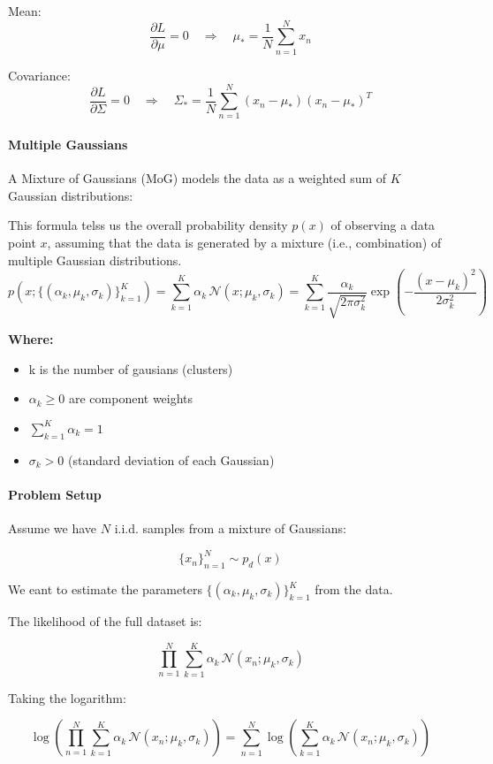 \documentclass[11pt]{article}
\begin{document}
Mean:
\[
	\frac{\partial L}{\partial \mu} = 0 \quad \Rightarrow \quad
	\mu_* = \frac{1}{N} \sum_{n=1}^{N} x_n
\]

Covariance:
\[
	\frac{\partial L}{\partial \Sigma} = 0 \quad \Rightarrow \quad
	\Sigma_* = \frac{1}{N} \sum_{n=1}^{N} (x_n - \mu_*)(x_n - \mu_*)^T
\]

\pagebreak

\paragraph*{Multiple Gaussians}

A Mixture of Gaussians (MoG) models the data as a weighted sum of $K$ Gaussian distributions:

\medskip
This formula telss us the overall probability density $p(x)$ of observing a data point $x$, assuming that the data is generated by a mixture (i.e., combination) of multiple Gaussian distributions.
\[
	p(x; \{(\alpha_k, \mu_k, \sigma_k)\}_{k=1}^K)
	= \sum_{k=1}^{K} \alpha_k \, \mathcal{N}(x; \mu_k, \sigma_k)
	= \sum_{k=1}^{K} \frac{\alpha_k}{\sqrt{2\pi\sigma_k^2}}
	\exp\left( -\frac{(x - \mu_k)^2}{2\sigma_k^2} \right)
\]

\textbf{Where:}
\begin{itemize}
	\item k is the number of gausians (clusters)
	\item $\alpha_k \geq 0$ are component weights
	\item $\sum_{k=1}^K \alpha_k = 1$
	\item $\sigma_k > 0$ (standard deviation of each Gaussian)
\end{itemize}

\paragraph*{Problem Setup}
Assume we have $N$ i.i.d. samples from a mixture of Gaussians:

\[
	\{x_n\}_{n=1}^N \sim p_d(x)
\]

We eant to estimate the parameters $\{(\alpha_k, \mu_k, \sigma_k)\}_{k=1}^K$ from the data.

\medskip

The likelihood of the full dataset is:

\[
	\prod_{n=1}^{N} \sum_{k=1}^{K} \alpha_k \, \mathcal{N}(x_n; \mu_k, \sigma_k)
\]

Taking the logarithm:

\[
	\log \left( \prod_{n=1}^{N} \sum_{k=1}^{K} \alpha_k \, \mathcal{N}(x_n; \mu_k, \sigma_k) \right)
	= \sum_{n=1}^{N} \log \left( \sum_{k=1}^{K} \alpha_k \, \mathcal{N}(x_n; \mu_k, \sigma_k) \right)
\]
\end{document}
